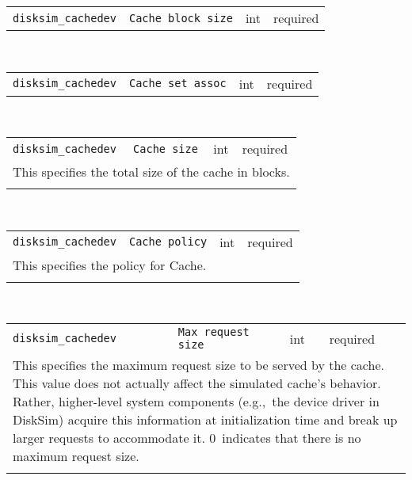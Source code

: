 \noindent 
\begin{tabular}{|p{\lpmodwidth}|p{\lpnamewidth}|p{0.5in}|p{0.5in}|}
\cline{1-4}
\texttt{disksim\_cachedev} & \texttt{Cache block size} & int & required \\ 
\cline{1-4}
\end{tabular}\\ 
\noindent 
\begin{tabular}{|p{\lpmodwidth}|p{\lpnamewidth}|p{0.5in}|p{0.5in}|}
\cline{1-4}
\texttt{disksim\_cachedev} & \texttt{Cache set assoc} & int & required \\ 
\cline{1-4}
\end{tabular}\\ 
\noindent 
\begin{tabular}{|p{\lpmodwidth}|p{\lpnamewidth}|p{0.5in}|p{0.5in}|}
\cline{1-4}
\texttt{disksim\_cachedev} & \texttt{Cache size} & int & required \\ 
\cline{1-4}
\multicolumn{4}{|p{6in}|}{
This specifies the total size of the cache in blocks.
}\\ 
\cline{1-4}
\multicolumn{4}{p{5in}}{}\\
\end{tabular}\\ 
\noindent 
\begin{tabular}{|p{\lpmodwidth}|p{\lpnamewidth}|p{0.5in}|p{0.5in}|}
\cline{1-4}
\texttt{disksim\_cachedev} & \texttt{Cache policy} & int & required \\ 
\cline{1-4}
\multicolumn{4}{|p{6in}|}{
This specifies the policy for Cache.
}\\ 
\cline{1-4}
\multicolumn{4}{p{5in}}{}\\
\end{tabular}\\ 
\noindent 
\begin{tabular}{|p{\lpmodwidth}|p{\lpnamewidth}|p{0.5in}|p{0.5in}|}
\cline{1-4}
\texttt{disksim\_cachedev} & \texttt{Max request size} & int & required \\ 
\cline{1-4}
\multicolumn{4}{|p{6in}|}{
This specifies the maximum request size to be served by the cache. This
value does not actually affect the simulated cache's behavior.
Rather, higher-level system components (e.g.,~the device driver in
DiskSim) acquire this information at initialization time and break up
larger requests to accommodate it. 0~indicates that there is no
maximum request size.
}\\ 
\cline{1-4}
\multicolumn{4}{p{5in}}{}\\
\end{tabular}\\ 
